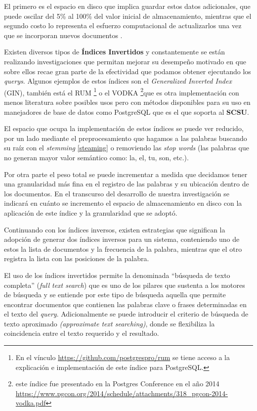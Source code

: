 \documentclass[
  12pt,
  openany]{book}
\begin{document}
El primero es el espacio en disco que implica guardar estos datos adicionales, que puede oscilar del 5\% al 100\% del valor inicial de almacenamiento, mientras que el segundo costo lo representa el esfuerzo computacional de actualizarlos una vez que se incorporan nuevos documentos \citep{Mahapatra2011}.

Existen diversos tipos de \textbf{Índices Invertidos} y constantemente se están realizando investigaciones que permitan mejorar su desempeño motivado en que sobre ellos recae gran parte de la efectividad que podamos obtener ejecutando los \emph{querys}. Algunos ejemplos de estos índices son el \emph{Generalized Inverted Index} (GIN), también está el RUM \footnote{En el vínculo \url{https://github.com/postgrespro/rum} se tiene acceso a la explicación e implementación de este índice para PostgreSQL.} o el VODKA \footnote{este índice fue presentado en la Postgres Conference en el año 2014 \url{https://www.pgcon.org/2014/schedule/attachments/318_pgcon-2014-vodka.pdf}}que es otra implementación con menos literatura sobre posibles usos pero con métodos disponibles para su uso en manejadores de base de datos como PostgreSQL que es el que soporta al \textbf{SCSU}.

El espacio que ocupa la implementación de estos índices se puede ver reducido, por un lado mediante el preprocesamiento que hagamos a las palabras buscando su raíz con el \emph{stemming} \ref{steaming} o removiendo las \emph{stop words} (las palabras que no generan mayor valor semántico como: la, el, tu, son, etc.).

Por otra parte el peso total se puede incrementar a medida que decidamos tener una granularidad más fina en el registro de las palabras y su ubicación dentro de los documentos. En el transcurso del desarrollo de nuestra investigación se indicará en cuánto se incremento el espacio de almacenamiento en disco con la aplicación de este índice y la granularidad que se adoptó.

Continuando con los índices inversos, existen estrategias que significan la adopción de generar dos índices inversos para un sistema, conteniendo uno de estos la lista de documentos y la frecuencia de la palabra, mientras que el otro registra la lista con las posiciones de la palabra.

El uso de los índices invertidos permite la denominada ``búsqueda de texto completa'' (\emph{full text search}) que es uno de los pilares que sustenta a los motores de búsqueda y se entiende por este tipo de búsqueda aquella que permite encontrar documentos que contienen las palabras clave o frases determinadas en el texto del \emph{query}. Adicionalmente se puede introducir el criterio de búsqueda de texto aproximado \emph{(approximate text searching)}, donde se flexibiliza la coincidencia entre el texto requerido y el resultado.
\end{document}
